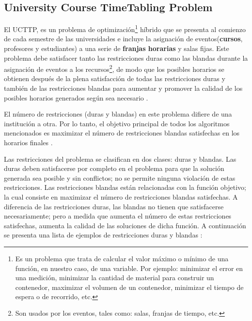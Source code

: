 \subsection{University Course TimeTabling Problem}

El UCTTP, es un problema de optimización\footnote{Es un problema que trata de calcular el valor máximo o mínimo de una función, en nuestro caso, de una variable. Por ejemplo: minimizar el error en una medición, minimizar la cantidad de material para construir un contenedor, maximizar el volumen de un contenedor, minimizar el tiempo de espera o de recorrido, etc.} híbrido que se presenta al comienzo de cada semestre de las universidades e incluye la asignación de eventos(\textbf{cursos}, profesores y estudiantes) a una serie de \textbf{franjas horarias} y salas fijas. Este problema debe satisfacer tanto las restricciones duras como las blandas durante la asignación de eventos a los recursos\footnote{Son usados por los eventos, tales como: salas, franjas de tiempo, etc.}, de modo que los posibles horarios se obtienen después de la plena satisfacción de todas las restricciones duras y también de las restricciones blandas para aumentar y promover la calidad de los posibles horarios generados según sea necesario \cite{UCTTP_ThreePhaseApproach}.\newline

El número de restricciones (duras y blandas) en este problema difiere de una institución a otra. Por lo tanto, el objetivo principal de todos los algoritmos mencionados es maximizar el número de restricciones blandas satisfechas en los horarios finales \cite{article_1445178}.\newline

Las restricciones del problema se clasifican en dos clases: duras y blandas. Las duras deben satisfacerse por completo en el problema para que la solución generada sea posible y sin conflictos; no se permite ninguna violación de estas restricciones. Las restricciones blandas están relacionadas con la función objetivo; la cual consiste en maximizar el número de restricciones blandas satisfechas. A diferencia de las restricciones duras, las blandas no tienen que satisfacerse necesariamente; pero a medida que aumenta el número de estas restricciones satisfechas, aumenta la calidad de las soluciones de dicha función. A continuación se presenta una lista de ejemplos de restricciones duras y blandas \cite{BABAEI201543}:

